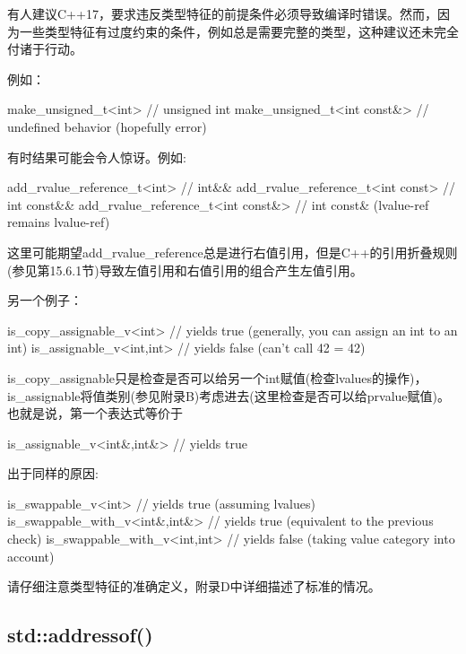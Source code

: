 \begin{notice}有人建议C++17，要求违反类型特征的前提条件必须导致编译时错误。然而，因为一些类型特征有过度约束的条件，例如总是需要完整的类型，这种建议还未完全付诸于行动。
\end{notice}

例如：

\begin{cpp}
make_unsigned_t<int> // unsigned int
make_unsigned_t<int const&> // undefined behavior (hopefully error)
\end{cpp}

有时结果可能会令人惊讶。例如:

\begin{cpp}
add_rvalue_reference_t<int> // int&&
add_rvalue_reference_t<int const> // int const&&
add_rvalue_reference_t<int const&> // int const& (lvalue-ref remains lvalue-ref)
\end{cpp}

这里可能期望add\_rvalue\_reference总是进行右值引用，但是C++的引用折叠规则(参见第15.6.1节)导致左值引用和右值引用的组合产生左值引用。

另一个例子：

\begin{cpp}
is_copy_assignable_v<int> // yields true (generally, you can assign an int to an int)
is_assignable_v<int,int> // yields false (can’t call 42 = 42)
\end{cpp}

is\_copy\_assignable只是检查是否可以给另一个int赋值(检查lvalues的操作)，is\_assignable将值类别(参见附录B)考虑进去(这里检查是否可以给prvalue赋值)。也就是说，第一个表达式等价于

\begin{cpp}
is_assignable_v<int&,int&> // yields true
\end{cpp}

出于同样的原因:

\begin{cpp}
is_swappable_v<int> // yields true (assuming lvalues)
is_swappable_with_v<int&,int&> // yields true (equivalent to the previous check)
is_swappable_with_v<int,int> // yields false (taking value category into account)
\end{cpp}

请仔细注意类型特征的准确定义，附录D中详细描述了标准的情况。

\subsection{std::addressof()}

